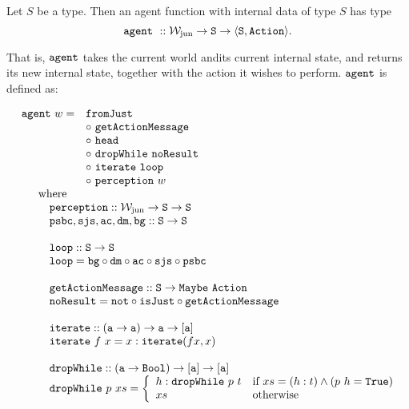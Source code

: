 \begin{definition}
	Let $S$ be a type. Then an agent function with internal data of type $S$ has type
	$$
		\mathtt{agent}\ :: \mathtt{\mathcal{W}_{\mathrm{jun}} \rightarrow S \rightarrow \langle S, Action \rangle}.
	$$
	
	That is, $\mathtt{agent}$ takes the current world andits current internal state, and returns its new internal state, together with the action it wishes to perform. $\mathtt{agent}$ is defined as:
	
	$$
		\begin{array}{l}
			\begin{array}{l l}
				\field{agent}\ w = & \field{fromJust}\\
								   & \circ\ \field{getActionMessage}\\
								   & \circ\ \field{head}\\
								   & \circ\ \field{dropWhile}\ \field{noResult}\\
								   & \circ\ \field{iterate}\ \field{loop}\\
								   & \circ\ \field{perception}\ w\\
			\end{array}\\
			\quad \quad \mt{where}\\
			\quad \quad \quad \field{perception} :: \type{\wjun \rightarrow S \rightarrow S}\\
			\quad \quad \quad \field{psbc}, \field{sjs}, \field{ac}, \field{dm}, \field{bg} :: \type{S \rightarrow S}\\
			\\
			\quad \quad \quad \field{loop} :: \type{S \rightarrow S}\\
			\quad \quad \quad \field{loop} = \field{bg} \circ \field{dm} \circ \field{ac} \circ \field{sjs} \circ \field{psbc}\\
			\\
			\quad \quad \quad \field{getActionMessage} :: \type{S \rightarrow Maybe\ Action}\\
			\quad \quad \quad \field{noResult} = \field{not} \circ \field{isJust} \circ \field{getActionMessage}\\
			\\
			\quad \quad \quad \field{iterate} :: \type{(a \rightarrow a) \rightarrow a \rightarrow [a]}\\
			\quad \quad \quad \field{iterate}\ f\ x = x : \field{iterate}(f x,x)\\
			\\
			\quad \quad \quad \field{dropWhile} :: \type{(a \rightarrow Bool) \rightarrow [a] \rightarrow [a]}\\
			\quad \quad \quad \field{dropWhile}\ p\ xs  = \left\{
				\begin{array}{l l}
					h : \field{dropWhile}\ p\ t & \mt{if } xs = (h:t) \wedge (p\ h = \type{True})\\
					xs & \mt{otherwise}\\
				\end{array}
			\right.\\
		\end{array}
	$$
	

\end{definition}
